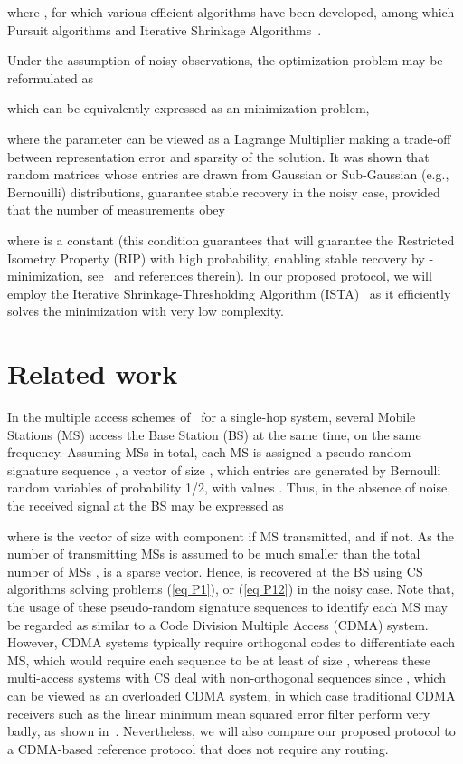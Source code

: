 \documentclass[letterpaper,conference]{IEEEtran}
\begin{document}
where , for which various efficient algorithms have been developed, among which Pursuit algorithms and Iterative Shrinkage Algorithms~\cite{Elad10}.

Under the assumption of noisy observations, the optimization problem may be reformulated as

which can be equivalently expressed as an  minimization problem,

where the parameter  can be viewed as a Lagrange Multiplier making a trade-off between representation error and sparsity of the solution.
It was shown that random matrices  whose entries are drawn from Gaussian or Sub-Gaussian (e.g., Bernouilli) distributions, guarantee stable recovery in the noisy case, provided that the number of measurements obey

where  is a constant (this condition guarantees that  will guarantee the Restricted Isometry Property (RIP) with high probability, enabling stable recovery by -minimization, see~\cite{Elad10} and references therein).
In our proposed protocol, we will employ the Iterative Shrinkage-Thresholding Algorithm (ISTA)~\cite{Dau04nov} as it efficiently solves the
 minimization  with very low complexity.


\section{Related work}
\label{sec RelatedWork}

In the multiple access schemes of~\cite{Qas09sep}\cite{Mao10apr}\cite{Bha09jun} for a single-hop system, several Mobile Stations (MS) access the Base Station (BS) at the same time, on the same frequency.
Assuming  MSs in total, each MS  is assigned a pseudo-random signature sequence , a vector of size , which entries are generated by Bernoulli random variables of probability 1/2, with values . Thus, in the absence of noise, the received signal  at the BS may be expressed as

where  is the vector of size  with component  if MS  transmitted, and  if not. As the number of transmitting MSs is assumed to be much smaller than the total number of MSs ,  is a sparse vector. Hence,  is recovered at the BS using CS algorithms solving problems (\ref{eq P1}), or (\ref{eq P12}) in the noisy case.
Note that, the usage of these pseudo-random signature sequences to identify each MS may be regarded as similar to a Code Division Multiple Access (CDMA) system. However, CDMA systems typically require orthogonal codes to differentiate each MS, which would require each sequence  to be at least of size , whereas these multi-access systems with CS deal with non-orthogonal sequences since , which can be viewed as an overloaded CDMA system, in which case traditional CDMA receivers such as the linear minimum mean squared error filter perform very badly, as shown in~\cite{Bha09jun}.
Nevertheless, we will also compare our proposed protocol to a CDMA-based reference protocol that does not require any routing.
\end{document}
